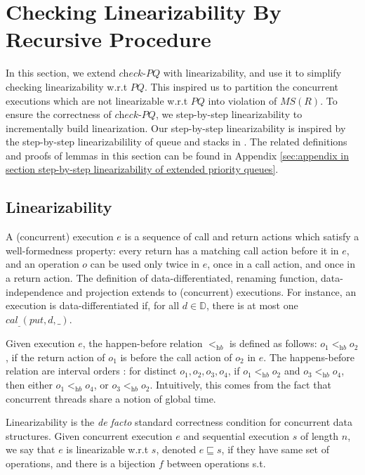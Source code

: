 \section{Checking Linearizability By Recursive Procedure}
\label{sec:checking linearizablity by recursive procedure}

In this section, we extend $\textit{check-PQ}$ with linearizability, and use it to simplify checking linearizability w.r.t $\textit{PQ}$. This inspired us to partition the concurrent executions which are not linearizable w.r.t $\textit{PQ}$ into violation of $\textit{MS}(R)$. To ensure the correctness of $\textit{check-PQ}$, we step-by-step linearizability to incrementally build linearization. Our step-by-step linearizability is inspired by the step-by-step linearizabilility of queue and stacks in \cite{Bouajjani:2015}. The related definitions and proofs of lemmas in this section can be found in Appendix \ref{sec:appendix in section step-by-step linearizability of extended priority queues}.


\subsection{Linearizability}
\label{subsec:linearizability}

A (concurrent) execution $e$ is a sequence of call and return actions which satisfy a well-formedness property: every return has a matching call action before it in $e$, and an operation $o$ can be used only twice in $e$, once in a call action, and once in a return action. The definition of data-differentiated, renaming function, data-independence and projection extends to (concurrent) executions. For instance, an execution is data-differentiated if, for all $d \in \mathbb{D}$, there is at most one $\textit{cal}_{\_}(\textit{put},d,\_)$.


Given execution $e$, the happen-before relation $<_{\textit{hb}}$ is defined as follows: $o_1 <_{\textit{hb}} o_2$, if the return action of $o_1$ is before the call action of $o_2$ in $e$. The happens-before relation are interval orders \cite{Bouajjani:2015POPL}: for distinct $o_1,o_2,o_3,o_4$, if $o_1 <_{\textit{hb}} o_2$ and $o_3 <_{\textit{hb}} o_4$, then either $o_1 <_{\textit{hb}} o_4$, or $o_3 <_{\textit{hb}} o_2$. Intuitively, this comes from the fact that concurrent threads share a notion of global time.

Linearizability \cite{Herlihy:1990} is the \emph{de facto} standard correctness condition for concurrent data structures. Given concurrent execution $e$ and sequential execution $s$ of length $n$, we say that $e$ is linearizable w.r.t $s$, denoted $e \sqsubseteq s$, if they have same set of operations, and there is a bijection $f$ between operations s.t.


